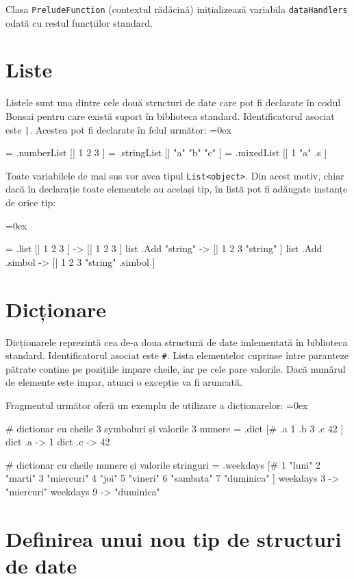 \documentclass[12pt,a4paper]{memoir}
\renewcommand{\c}{\texttt}
\newenvironment{code}
{
\definecolor{shadecolor}{gray}{0.91}
\topsep=0ex
\relax
\shaded
\verbatim
}
{
\endverbatim
\endshaded
}
\begin{document}
Clasa \c{PreludeFunction} (contextul rădăcină) inițializează variabila \c{dataHandlers} odată cu restul funcțiilor standard.

\section{Liste}

Listele sunt una dintre cele două structuri de date care pot fi declarate în codul Bonsai pentru care există suport în biblioteca standard. Identificatorul asociat este \c{|}. Acestea pot fi declarate în felul următor:
\begin{code}
= .numberList [| 1 2 3 ]
= .stringList [| "a" "b" "c" ]
= .mixedList [| 1 "a" .s ]
\end{code}

Toate variabilele de mai sus vor avea tipul \c{List<object>}. Din acest motiv, chiar dacă în declarație toate elementele au același tip, în listă pot fi adăugate instanțe de orice tip:

\begin{code}
= .list [| 1 2 3 ]
  -> [| 1 2 3 ]
list .Add "string"
  -> [| 1 2 3 "string" ]
list .Add .simbol
  -> [| 1 2 3 "string" .simbol ]
\end{code}

\section{Dicționare}

Dicționarele reprezintă cea de-a doua structură de date imlementată în biblioteca standard. Identificatorul asociat este \c{\#}. Lista elementelor cuprinse între paranteze pătrate conține pe pozițiile impare cheile, iar pe cele pare valorile. Dacă numărul de elemente este impar, atunci o excepție va fi aruncată.

Fragmentul următor oferă un exemplu de utilizare a dicționarelor:
\begin{code}
# dictionar cu cheile 3 symboluri și valorile 3 numere
= .dict [# .a 1 .b 3 .c 42 ]
dict .a 
  -> 1
dict .c
  -> 42

# dictionar cu cheile numere și valorile stringuri
= .weekdays [#
  1 "luni" 
  2 "marti" 
  3 "miercuri"
  4 "joi"
  5 "vineri"
  6 "sambata"
  7 "duminica"
]
weekdays 3
  -> "miercuri"
weekdays 9
  -> "duminica"
\end{code}

\section{Definirea unui nou tip de structuri de date}
\end{document}
